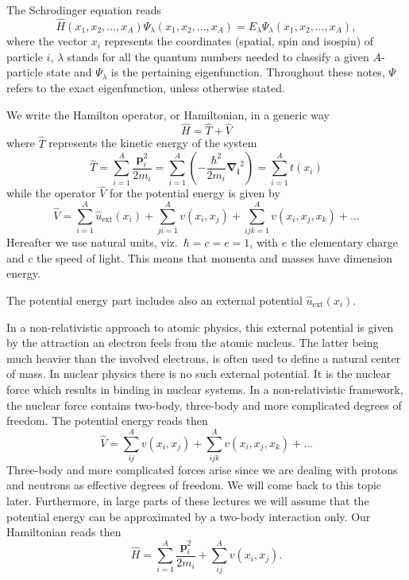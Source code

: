 \documentclass[%
oneside,                 %
final,                   %
10pt]{article}
\begin{document}
The Schrodinger equation reads 
\begin{equation}
\hat{H}(x_1, x_2, \dots , x_A) \Psi_{\lambda}(x_1, x_2, \dots , x_A) = 
E_\lambda  \Psi_\lambda(x_1, x_2, \dots , x_A), \label{eq:basicSE1}
\end{equation}
where the vector $x_i$ represents the coordinates (spatial, spin and isospin) of particle $i$, $\lambda$ stands  for all the quantum
numbers needed to classify a given $A$-particle state and $\Psi_{\lambda}$ is the pertaining eigenfunction.  Throughout these notes,
$\Psi$ refers to the exact eigenfunction, unless otherwise stated.


We write the Hamilton operator, or Hamiltonian,  in a generic way 
\[
	\hat{H} = \hat{T} + \hat{V} 
\]
where $\hat{T}$  represents the kinetic energy of the system
\[
	\hat{T} = \sum_{i=1}^A \frac{\mathbf{p}_i^2}{2m_i} = \sum_{i=1}^A \left( -\frac{\hbar^2}{2m_i} \mathbf{\nabla_i}^2 \right) =
		\sum_{i=1}^A t(x_i)
\]
while the operator $\hat{V}$ for the potential energy is given by
\begin{equation}
	\hat{V} = \sum_{i=1}^A \hat{u}_{\mathrm{ext}}(x_i) + \sum_{ji=1}^A v(x_i,x_j)+\sum_{ijk=1}^Av(x_i,x_j,x_k)+\dots
\label{eq:firstv}
\end{equation}
Hereafter we use natural units, viz.~$\hbar=c=e=1$, with $e$ the elementary charge and $c$ the speed of light. This means that momenta and masses
have dimension energy. 


The potential energy part includes also an external potential $\hat{u}_{\mathrm{ext}}(x_i)$.

In a non-relativistic approach to atomic  physics, this external potential is given by the attraction an electron feels from the atomic nucleus. The latter being much heavier than the involved electrons, is often used to define a natural center of mass. In nuclear physics there is no such external potential. It is the nuclear force which results in binding in nuclear systems. In a non-relativistic framework, the nuclear force contains two-body, three-body and more complicated degrees of freedom. The potential energy reads then  
\[
	\hat{V} = \sum_{ij}^A v(x_i,x_j)+\sum_{ijk}^Av(x_i,x_j,x_k)+\dots
\]
Three-body and more  complicated forces arise since we are dealing with protons and neutrons as effective degrees of freedom. We will come back to this topic later. Furthermore, in large parts of these lectures we will assume that the potential energy can be approximated by a two-body interaction only. Our Hamiltonian reads then
\begin{equation}
	\hat{H} = \sum_{i=1}^A \frac{\mathbf{p}_i^2}{2m_i}+\sum_{ij}^A v(x_i,x_j).
\label{eq:firstH}
\end{equation}
\end{document}

